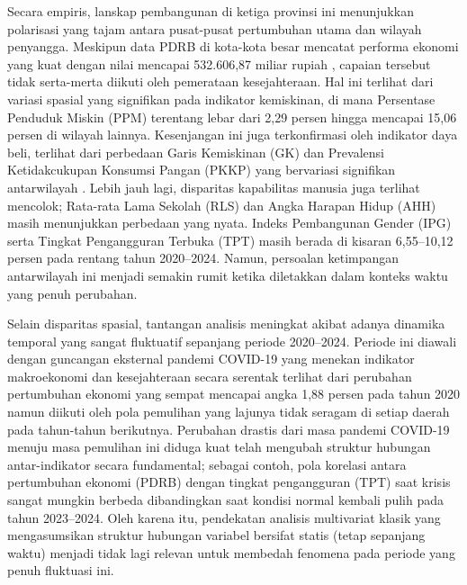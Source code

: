 \documentclass[a4paper]{article}
\theoremstyle{definition} %
\begin{document}
Secara empiris, lanskap pembangunan di ketiga provinsi ini menunjukkan polarisasi yang tajam antara pusat-pusat pertumbuhan utama dan wilayah penyangga. Meskipun data PDRB di kota-kota besar mencatat performa ekonomi yang kuat dengan nilai mencapai 532.606,87 miliar rupiah \citet{bpspdrb}, capaian tersebut tidak serta-merta diikuti oleh pemerataan kesejahteraan. Hal ini terlihat dari variasi spasial yang signifikan pada indikator kemiskinan, di mana Persentase Penduduk Miskin (PPM) terentang lebar dari 2,29 persen hingga mencapai 15,06 persen di wilayah lainnya. Kesenjangan ini juga terkonfirmasi oleh indikator daya beli, terlihat dari perbedaan Garis Kemiskinan (GK) dan Prevalensi Ketidakcukupan Konsumsi Pangan (PKKP) yang bervariasi signifikan antarwilayah \cite{bpspkkp}. Lebih jauh lagi, disparitas kapabilitas manusia juga terlihat mencolok; Rata-rata Lama Sekolah (RLS) dan Angka Harapan Hidup (AHH) masih menunjukkan perbedaan yang nyata. Indeks Pembangunan Gender (IPG) serta Tingkat Pengangguran Terbuka (TPT) masih berada di kisaran 6,55--10,12 persen pada rentang tahun 2020--2024. Namun, persoalan ketimpangan antarwilayah ini menjadi semakin rumit ketika diletakkan dalam konteks waktu yang penuh perubahan.

Selain disparitas spasial, tantangan analisis meningkat akibat adanya dinamika temporal yang sangat fluktuatif sepanjang periode 2020--2024. Periode ini diawali dengan guncangan eksternal pandemi COVID-19 yang menekan indikator makroekonomi dan kesejahteraan secara serentak terlihat dari perubahan pertumbuhan ekonomi yang sempat mencapai angka 1,88 persen pada tahun 2020 \citet{bpspdrb} namun diikuti oleh pola pemulihan yang lajunya tidak seragam di setiap daerah pada tahun-tahun berikutnya. Perubahan drastis dari masa pandemi COVID-19 menuju masa pemulihan ini diduga kuat telah mengubah struktur hubungan antar-indikator secara fundamental; sebagai contoh, pola korelasi antara pertumbuhan ekonomi (PDRB) dengan tingkat pengangguran (TPT) saat krisis sangat mungkin berbeda dibandingkan saat kondisi normal kembali pulih pada tahun 2023--2024. Oleh karena itu, pendekatan analisis multivariat klasik yang mengasumsikan struktur hubungan variabel bersifat statis (tetap sepanjang waktu) menjadi tidak lagi relevan untuk membedah fenomena pada periode yang penuh fluktuasi ini.
\end{document}

